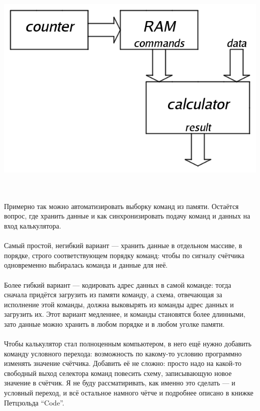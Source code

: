 \documentclass[11pt]{book}
\begin{document}
\begin{minipage}{0.4\textwidth}
\includegraphics[width=\textwidth]{pic/automation.png}
\end{minipage}
\\ \\
Примерно так можно автоматизировать выборку команд из памяти.
Остаётся вопрос, где хранить данные и как синхронизировать подачу команд и данных на вход калькулятора.
\\ \\
Самый простой, негибкий вариант --- хранить данные в отдельном массиве, в порядке,
строго соответствующем порядку команд: чтобы по сигналу счётчика
одновременно выбиралась команда и данные для неё.
\\ \\
Более гибкий вариант --- кодировать адрес данных в самой команде:
тогда сначала придётся загрузить из памяти команду, а схема, отвечающая за исполнение этой команды,
должна выковырять из команды адрес данных и загрузить их.
Этот вариант медленнее, и команды становятся более длинными, зато данные можно хранить в любом порядке и в любом уголке памяти.
\\ \\
Чтобы калькулятор стал полноценным компьютером, в него ещё нужно добавить команду условного перехода:
возможность по какому-то условию программно изменять значение счётчика.
Добавить её не сложно: просто надо на какой-то свободный выход селектора команд повесить схему,
записывающую новое значение в счётчик.
Я не буду рассматиривать, как именно это сделать --- и условный переход, и всё остальное
намного чётче и подробнее описано в книжке Петцзольда ``Code''.
\end{document}
